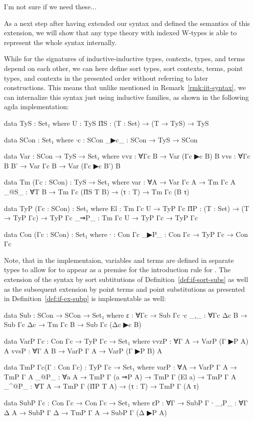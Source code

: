 \begin{defn}
I'm not sure if we need these...
\end{defn}

As a next step after having extended our syntax and defined the semantics of this
extension, we will show that any type theory with indexed W-types is able
to represent the whole syntax internally.

\begin{remark}
While for the signatures of inductive-inductive types, contexts, types, and terms
depend on each other, we can here define sort types, sort contexts, terms, point
types, and contexts in the presented order without referring to later constructions.
This means that unlike mentioned in Remark~\ref{rmk:iit-syntax}, we  can %
internalize this syntax just using inductive families, as shown in the
following agda implementation:
\begin{agdacode}
data TyS : Set₁ where
  U  : TyS
  Π̂S : (T : Set) → (T → TyS) → TyS

data SCon : Set₁ where
  ∙c   : SCon
  _▶c_ : SCon → TyS → SCon

data Var : SCon → TyS → Set₁ where
  vvz : ∀{Γc B} → Var (Γc ▶c B) B
  vvs : ∀{Γc B B'} → Var Γc B → Var (Γc ▶c B') B

data Tm (Γc : SCon) : TyS → Set₁ where
  var  : ∀{A} → Var Γc A → Tm Γc A
  _@S_ : ∀{T B} → Tm Γc (Π̂S T B) → (τ : T) → Tm Γc (B τ)

data TyP (Γc : SCon) : Set₁ where
  El   : Tm Γc U → TyP Γc
  Π̂P   : (T : Set) → (T → TyP Γc) → TyP Γc
  _⇒P_ : Tm Γc U → TyP Γc → TyP Γc

data Con (Γc : SCon) : Set₁ where
  ∙    : Con Γc
  _▶P_ : Con Γc → TyP Γc → Con Γc
\end{agdacode}
Note, that in the implementaion, variables and terms are defined in separate
types to allow for  to appear as a premise for the introduction rule
for .
The extension of the syntax by sort subtitutions of Definition~\ref{def:if-sort-subs}
as well as the subsequent extension by point terms and point substitutions as presented in
Definition~\ref{def:if-ex-subp} is implementable as well:
\begin{agdacode}
data Sub : SCon → SCon → Set₁ where
  ε   : ∀{Γc} → Sub Γc ∙c
  _,_ : ∀{Γc Δc B} → Sub Γc Δc → Tm Γc B → Sub Γc (Δc ▶c B)

data VarP {Γc} : Con Γc → TyP Γc → Set₁ where
  vvzP : ∀{Γ A} → VarP (Γ ▶P A) A
  vvsP : ∀{Γ A B} → VarP Γ A → VarP (Γ ▶P B) A

data TmP {Γc}(Γ : Con Γc) : TyP Γc → Set₁ where
  varP : ∀{A} → VarP Γ A → TmP Γ A
  _@P_ : ∀{a A} → TmP Γ (a ⇒P A) → TmP Γ (El a) → TmP Γ A
  _^@P_ : ∀{T A} → TmP Γ (Π̂P T A) → (τ : T) → TmP Γ (A τ)

data SubP {Γc} : Con Γc → Con Γc → Set₁ where
  εP   : ∀{Γ} → SubP Γ ∙
  _,P_ : ∀{Γ Δ A} → SubP Γ Δ → TmP Γ A → SubP Γ (Δ ▶P A)
\end{agdacode}
\end{remark}

